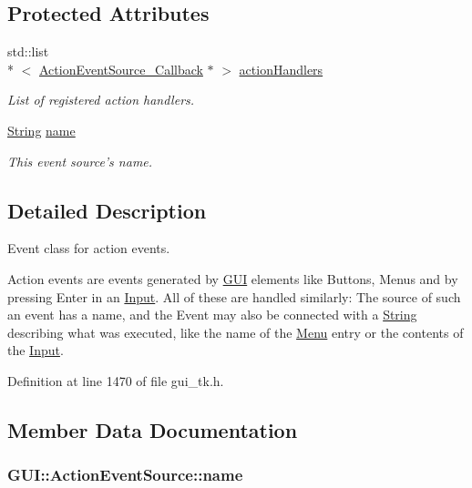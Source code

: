 \subsection*{Protected Attributes}
\begin{DoxyCompactItemize}
\item 
\hypertarget{classGUI_1_1ActionEventSource_a9cd3562084ba5fa2b3d9d72ac3fa1baa}{std\-::list\\*
$<$ \hyperlink{structGUI_1_1ActionEventSource__Callback}{Action\-Event\-Source\-\_\-\-Callback} $\ast$ $>$ \hyperlink{classGUI_1_1ActionEventSource_a9cd3562084ba5fa2b3d9d72ac3fa1baa}{action\-Handlers}}\label{classGUI_1_1ActionEventSource_a9cd3562084ba5fa2b3d9d72ac3fa1baa}

\begin{DoxyCompactList}\small\item\em List of registered action handlers. \end{DoxyCompactList}\item 
\hyperlink{classGUI_1_1String}{String} \hyperlink{classGUI_1_1ActionEventSource_ab494e66ccff6518e1cabe747df2173f8}{name}
\begin{DoxyCompactList}\small\item\em This event source's name. \end{DoxyCompactList}\end{DoxyCompactItemize}


\subsection{Detailed Description}
Event class for action events. 

Action events are events generated by \hyperlink{namespaceGUI}{G\-U\-I} elements like Buttons, Menus and by pressing Enter in an \hyperlink{classGUI_1_1Input}{Input}. All of these are handled similarly\-: The source of such an event has a name, and the Event may also be connected with a \hyperlink{classGUI_1_1String}{String} describing what was executed, like the name of the \hyperlink{classGUI_1_1Menu}{Menu} entry or the contents of the \hyperlink{classGUI_1_1Input}{Input}. 

Definition at line 1470 of file gui\-\_\-tk.\-h.



\subsection{Member Data Documentation}
\hypertarget{classGUI_1_1ActionEventSource_ab494e66ccff6518e1cabe747df2173f8}{
\subsubsection[{name}]{ {\bf G\-U\-I\-::\-Action\-Event\-Source\-::name}}}\label{classGUI_1_1ActionEventSource_ab494e66ccff6518e1cabe747df2173f8}


